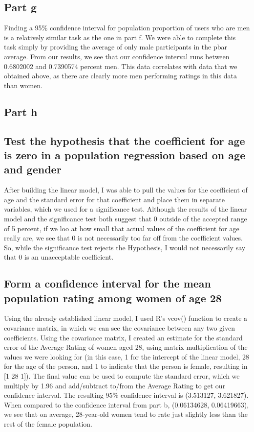 \documentclass{article}
\begin{document}
  \subsection*{Part g}
    Finding a 95\% confidence interval for population proportion of users who are men is a relatively similar task as the one in part f. We were able to complete this task simply by providing the average of only male participants in the pbar average. From our results, we see that our confidence interval runs between 0.6802002 and 0.7390574 percent men. This data correlates with data that we obtained above, as there are clearly more men performing ratings in this data than women.
  \subsection*{Part h}
      \subsection*{Test the hypothesis that the coefficient for age is zero in a population regression based on age and gender}
        After building the linear model, I was able to pull the values for the coefficient of age and the standard error for that coefficient and place them in separate variables, which we used for a significance test. 
        \newline Although the results of the linear model and the significance test both suggest that 0 outside of the accepted range of 5 percent, if we loo at how small that actual values of the coefficient for age really are, we see that 0 is not necessarily too far off from the coefficient values. So, while the significance test rejects the Hypothesis, I would not necessarily say that 0 is an unacceptable coefficient.
      \subsection*{Form a confidence interval for the mean population rating among women of age 28}
        Using the already established linear model, I used R's vcov() function to create a covariance matrix, in which we can see the covariance between any two given coefficients. Using the covariance matrix, I created an estimate for the standard error of the Average Rating of women aged 28, using matrix multiplication of the values we were looking for (in this case, 1 for the intercept of the linear model, 28 for the age of the person, and 1 to indicate that the person is female, resulting in [1 28 1]). The final value can be used to compute the standard error, which we multiply by 1.96 and add/subtract to/from the Average Rating to get our confidence interval.
        \newline The resulting 95\% confidence interval is (3.513127, 3.621827). When compared to the confidence interval from part b, (0.06134628, 0.06419663), we see that on average, 28-year-old women tend to rate just slightly less than the rest of the female population. 
    
\end{document}
